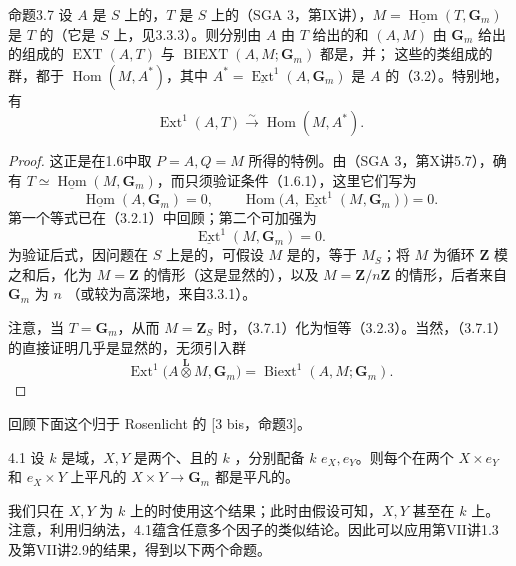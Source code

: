 \begin{SGAresult}{命题}{3.7}
设 $A$ 是 $S$ 上的，$T$ 是 $S$ 上的（SGA 3，第IX讲），$M=\underline{\operatorname{Hom}}(T,\mathbf G_m)$ 是 $T$ 的（它是 $S$ 上，见3.3.3）。则分别由 $A$ 由 $T$ 给出的和 $(A,M)$ 由 $\mathbf G_m$ 给出的组成的 $\operatorname{EXT}(A,T)$ 与 $\operatorname{BIEXT}(A,M;\mathbf G_m)$ 都是，并；
这些的类组成的群，都于 $\operatorname{Hom}(M,A^*)$，其中 $A^*=\underline{\operatorname{Ext}}^1(A,\mathbf G_m)$ 是 $A$ 的（3.2）。特别地，有
\[
\operatorname{Ext}^1(A,T)\xrightarrow{\sim}\operatorname{Hom}(M,A^*).\tag{3.7.1}
\]
\end{SGAresult}
\begin{proof}
这正是在1.6中取 $P=A,Q=M$ 所得的特例。由（SGA 3，第X讲5.7），确有 $T\simeq\underline{\operatorname{Hom}}(M,\mathbf G_m)$，而只须验证条件（1.6.1），这里它们写为
\[
\underline{\operatorname{Hom}}(A,\mathbf G_m)=0,\qquad
\operatorname{Hom}\bigl(A,\underline{\operatorname{Ext}}^1(M,\mathbf G_m)\bigr)=0.
\]
第一个等式已在（3.2.1）中回顾；第二个可加强为
\[\underline{\operatorname{Ext}}^1(M,\mathbf G_m)=0.\]
为验证后式，因问题在 $S$ 上是的，可假设 $M$ 是的，等于 $M_S$；将 $M$ 为循环 $\mathbf Z$ 模之和后，化为 $M=\mathbf Z$ 的情形（这是显然的），以及 $M=\mathbf Z/n\mathbf Z$ 的情形，后者来自 $\mathbf G_m$ 为 $n$ （或较为高深地，来自3.3.1）。

注意，当 $T=\mathbf G_m$，从而 $M=\mathbf Z_S$ 时，（3.7.1）化为恒等（3.2.3）。当然，（3.7.1）的直接证明几乎是显然的，无须引入群
\[\operatorname{Ext}^1\bigl(A\mathbin{\overset{\mathbf L}{\otimes}}M,\mathbf G_m\bigr)=\operatorname{Biext}^1(A,M;\mathbf G_m).\]
\end{proof}

回顾下面这个归于 Rosenlicht 的 [3 bis，命题3]。
\begin{SGAresult}{}{4.1}
设 $k$ 是域，$X,Y$ 是两个、且的 $k$ ，分别配备 $k$  $e_X,e_Y$。则每个在两个 $X\times e_Y$ 和 $e_X\times Y$ 上平凡的 $X\times Y\to\mathbf G_m$ 都是平凡的。
\end{SGAresult}
我们只在 $X,Y$ 为 $k$ 上的时使用这个结果；此时由假设可知，$X,Y$ 甚至在 $k$ 上。注意，利用归纳法，4.1蕴含任意多个因子的类似结论。因此可以应用第VII讲1.3及第VII讲2.9的结果，得到以下两个命题。

